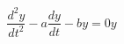 \documentclass[12pt]{article}
\begin{document}
\sicpsize
\[
\frac{d^2y}{dt^2} - a \frac{dy}{dt} - by = 0y
\]
\end{document}
